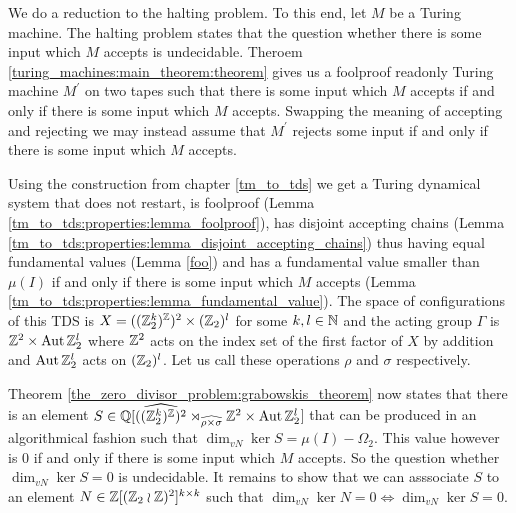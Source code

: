 \proof
	We do a reduction to the halting problem. To this end, let $M$ be a Turing machine. The halting problem states that the question whether there is some input which $M$ accepts is undecidable.
	Theroem \ref{turing_machines:main_theorem:theorem} gives us a foolproof readonly Turing machine $M^\prime$ on two tapes such that there is some input which $M$ accepts if and only if there is some input which $M$ accepts.
	Swapping the meaning of accepting and rejecting we may instead assume that $M^\prime$ rejects some input if and only if there is some input which $M$ accepts.

	Using the construction from chapter \ref{tm_to_tds} we get a Turing dynamical system that
	does not restart,
	is foolproof (Lemma \ref{tm_to_tds:properties:lemma_foolproof}),
	has disjoint accepting chains (Lemma \ref{tm_to_tds:properties:lemma_disjoint_accepting_chains})
	thus having equal fundamental values (Lemma \ref{foo}) and
	has a fundamental value smaller than $\mu(I)$ if and only if there is some input which $M$ accepts (Lemma \ref{tm_to_tds:properties:lemma_fundamental_value}).
	The space of configurations of this TDS is $X = ((\mathbb{Z}_2^k)^{\mathbb{Z}})^2 \times (\mathbb{Z}_2)^l$ for some $k, l \in \mathbb{N}$
	and the acting group $\Gamma$ is $\mathbb{Z}^2 \times \operatorname{Aut} \mathbb{Z}_2^l$
	where $\mathbb{Z}^2$ acts on the index set of the first factor of $X$ by addition
	and $\operatorname{Aut} \mathbb{Z}_2^l$ acts on $(\mathbb{Z}_2)^l$.
	Let us call these operations $\rho$ and $\sigma$ respectively.

	Theorem \ref{the_zero_divisor_problem:grabowskis_theorem} now states that there is an element $S \in \mathbb{Q}[\widehat{((\mathbb{Z}_2^k)^{\mathbb{Z}})^2} \rtimes_{\widehat{\rho \times \sigma}} \mathbb{Z}^2 \times \operatorname{Aut} \mathbb{Z}_2^l$] that can be produced in an algorithmical fashion such that $\dim_{vN} \ker S = \mu(I) - \Omega_2$.
	This value however is $0$ if and only if there is some input which $M$ accepts. So the question whether $\dim_{vN} \ker S = 0$ is undecidable.
	It remains to show that we can asssociate $S$ to an element $N \in \mathbb{Z}[(\mathbb{Z}_2 \wr \mathbb{Z})^2]^{k \times k}$ such that $\dim_{vN} \ker N = 0 \Leftrightarrow \dim_{vN} \ker S = 0$.

